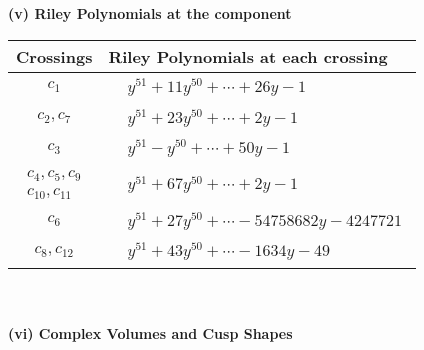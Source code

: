 \documentclass[1p]{elsarticle_modified}
\theoremstyle{definition}
\begin{document}
\newpage\renewcommand{\arraystretch}{1}
\flushleft \textbf{(v) Riley Polynomials at the component}\newline \\
\begin{tabular}{m{50pt}|m{274pt}}
Crossings & \hspace{64pt}Riley Polynomials at each crossing \\
\hline $$\begin{aligned}c_{1}\end{aligned}$$&$\begin{aligned}
&y^{51}+11 y^{50}+\cdots+26 y-1
\end{aligned}$\\
\hline $$\begin{aligned}c_{2},c_{7}\end{aligned}$$&$\begin{aligned}
&y^{51}+23 y^{50}+\cdots+2 y-1
\end{aligned}$\\
\hline $$\begin{aligned}c_{3}\end{aligned}$$&$\begin{aligned}
&y^{51}- y^{50}+\cdots+50 y-1
\end{aligned}$\\
\hline $$\begin{aligned}c_{4},c_{5},c_{9}\\c_{10},c_{11}\end{aligned}$$&$\begin{aligned}
&y^{51}+67 y^{50}+\cdots+2 y-1
\end{aligned}$\\
\hline $$\begin{aligned}c_{6}\end{aligned}$$&$\begin{aligned}
&y^{51}+27 y^{50}+\cdots-54758682 y-4247721
\end{aligned}$\\
\hline $$\begin{aligned}c_{8},c_{12}\end{aligned}$$&$\begin{aligned}
&y^{51}+43 y^{50}+\cdots-1634 y-49
\end{aligned}$\\
\hline
\end{tabular}\\~\\
\newpage\flushleft \textbf{(vi) Complex Volumes and Cusp Shapes}
\end{document}
